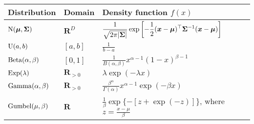 \begin{tabularx}{\linewidth}{llX}
  Distribution & Domain & Density function $f(x)$ \\
  \midrule
  \rule{0pt}{5ex}%
  $\mathrm{N}( \bm{\mu}, \bm{\Sigma} )$
    & $\mathbf{R}^D$
    & $\displaystyle \frac{1}{\sqrt{2 \pi \lvert\bm{\Sigma}\rvert}}
        \exp \left[ -\frac{1}{2} (\bm{x} - \bm{\mu})^\top \bm{\Sigma}^{-1} (\bm{x} - \bm{\mu}) \right]$ \\
  \rule{0pt}{5ex}%
  $\mathrm{U}( a, b )$
    & $[a, b]$
    & $\displaystyle \frac{1}{b - a}$ \\
  \rule{0pt}{5ex}%
  $\mathrm{Beta}( \alpha, \beta )$
    & $[0, 1]$
    & $\displaystyle \frac{1}{B(\alpha, \beta)} x^{\alpha - 1} (1-x)^{\beta - 1}$ \\
  $\mathrm{Exp}( \lambda )$
    & $\mathbf{R}_{>0}$
    & $\displaystyle \lambda \exp(- \lambda x)$ \\
  \rule{0pt}{5ex}%
  $\mathrm{Gamma}( \alpha, \beta )$
    & $\mathbf{R}_{>0}$
    & $\displaystyle \frac{\beta^\alpha}{\Gamma(\alpha)} x^{\alpha-1} \exp(- \beta x)$ \\
  \rule{0pt}{5ex}%
  $\mathrm{Gumbel}( \mu, \beta )$
    & $\mathbf{R}$
    & $\displaystyle \frac{1}{\beta} \exp \{ - [z + \exp(-z)]\}$, where $\displaystyle z = \frac{x - \mu}{\beta}$ \\
\end{tabularx}

\endgroup
